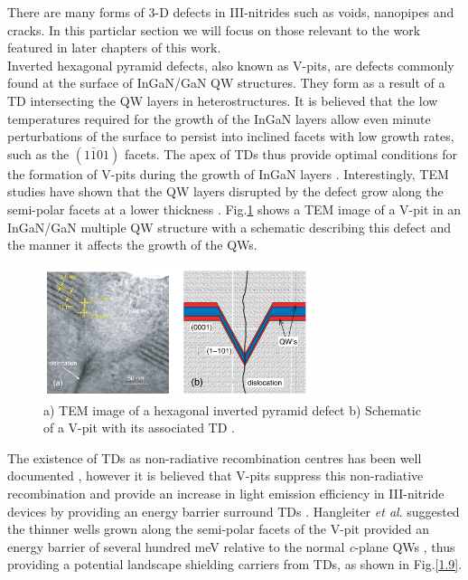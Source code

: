 There are many forms of 3-D defects in III-nitrides such as voids, nanopipes and cracks. In this particlar section we will focus on those relevant to the work featured in later chapters of this work.\\
Inverted hexagonal pyramid defects, also known as V-pits, are defects commonly found at the surface of InGaN/GaN QW structures. They form as a result of a TD intersecting the QW layers in heterostructures. It is believed that the low temperatures required for the growth of the InGaN layers allow even minute perturbations of the surface to persist into inclined facets with low growth rates, such as the $(1\bar{1}01)$ facets. The apex of TDs thus provide optimal conditions for the formation of V-pits during the growth of InGaN layers \cite{Hangleiter2005}. Interestingly, TEM studies have shown that the QW layers disrupted by the defect grow along the semi-polar facets at a lower thickness \cite{Hangleiter2005,Han2013,Tsai2007}. Fig.\ref{1.8} shows a TEM image of a V-pit in an InGaN/GaN multiple QW structure with a schematic describing this defect and the manner it affects the growth of the QWs.

\begin{figure}[h]
	\centering
	\includegraphics[width=0.7\textwidth]{Figs/Ch1/vpit.png}
	\caption {a) TEM image of a hexagonal inverted pyramid defect b) Schematic  of a V-pit with its associated TD \cite{Hangleiter2005}.}
	\label{1.8}
\end{figure}
\FloatBarrier 

The existence of TDs as non-radiative recombination centres has been well documented \cite{Bennett2010b}, however it is believed that V-pits suppress this non-radiative recombination and provide an increase in light emission efficiency in III-nitride devices by providing an energy barrier surround TDs \cite{Hangleiter2005}. Hangleiter {\it et al}. suggested the thinner wells grown along the semi-polar facets of the V-pit provided an energy barrier of several hundred meV relative to the normal {\it c}-plane QWs \cite{Hangleiter2005}, thus providing a potential landscape shielding carriers from TDs, as shown in Fig.\ref{1.9}.

